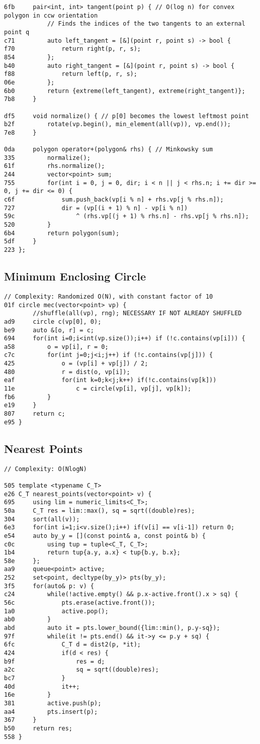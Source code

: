 \documentclass[11pt, a4paper, twoside]{article}
\begin{document}
\begin{lstlisting}
6fb 	pair<int, int> tangent(point p) { // O(log n) for convex polygon in ccw orientation
    		// Finds the indices of the two tangents to an external point q
c71 		auto left_tangent = [&](point r, point s) -> bool {
f70 			return right(p, r, s);
854 		};
b40 		auto right_tangent = [&](point r, point s) -> bool {
f88 			return left(p, r, s);
06e 		};
6b0 		return {extreme(left_tangent), extreme(right_tangent)};
7b8 	}
    
df5 	void normalize() { // p[0] becomes the lowest leftmost point 
b2f 		rotate(vp.begin(), min_element(all(vp)), vp.end());
7e8 	}
    
0da 	polygon operator+(polygon& rhs) { // Minkowsky sum
335 		normalize();
61f 		rhs.normalize();
244 		vector<point> sum;
755 		for(int i = 0, j = 0, dir; i < n || j < rhs.n; i += dir >= 0, j += dir <= 0) {
c6f 			sum.push_back(vp[i % n] + rhs.vp[j % rhs.n]);
727 			dir = (vp[(i + 1) % n] - vp[i % n]) 
59c 				^ (rhs.vp[(j + 1) % rhs.n] - rhs.vp[j % rhs.n]);
520 		}
6b4 		return polygon(sum);
5df 	}
223 };
\end{lstlisting}

\subsection{Minimum Enclosing Circle}
\begin{lstlisting}
// Complexity: Randomized O(N), with constant factor of 10
01f circle mec(vector<point> vp) {
    	//shuffle(all(vp), rng); NECESSARY IF NOT ALREADY SHUFFLED
ad9 	circle c(vp[0], 0);
be9 	auto &[o, r] = c;
694 	for(int i=0;i<int(vp.size());i++) if (!c.contains(vp[i])) {
a58 		o = vp[i], r = 0;
c7c 		for(int j=0;j<i;j++) if (!c.contains(vp[j])) {
425 			o = (vp[i] + vp[j]) / 2;
480 			r = dist(o, vp[i]);
eaf 			for(int k=0;k<j;k++) if(!c.contains(vp[k]))
11e 				c = circle(vp[i], vp[j], vp[k]);
fb6 		}
e19 	}
807 	return c;
e95 }
\end{lstlisting}

\subsection{Nearest Points}
\begin{lstlisting}
// Complexity: O(NlogN)

505 template <typename C_T>
e26 C_T nearest_points(vector<point> v) {
695 	using lim = numeric_limits<C_T>;
50a 	C_T res = lim::max(), sq = sqrt((double)res);
304 	sort(all(v));
6e3 	for(int i=1;i<v.size();i++) if(v[i] == v[i-1]) return 0;
e54 	auto by_y = [](const point& a, const point& b) {
c0c 		using tup = tuple<C_T, C_T>;
1b4 		return tup{a.y, a.x} < tup{b.y, b.x};
58e 	};
aa9 	queue<point> active;
252 	set<point, decltype(by_y)> pts(by_y);
3f5 	for(auto& p: v) {
c24 		while(!active.empty() && p.x-active.front().x > sq) {
56c 			pts.erase(active.front());
1a0 			active.pop();
ab0 		}
abd 		auto it = pts.lower_bound({lim::min(), p.y-sq});
97f 		while(it != pts.end() && it->y <= p.y + sq) {
6fc 			C_T d = dist2(p, *it);
424 			if(d < res) {
b9f 				res = d;
a2c 				sq = sqrt((double)res);
bc7 			}
40d 			it++;
16e 		}
381 		active.push(p);
aa4 		pts.insert(p);
367 	}
b50 	return res;
558 }
\end{lstlisting}
\end{document}
